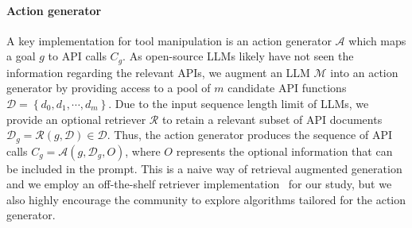 \paragraph{Action generator} A key implementation for tool manipulation is an action generator $\mathcal{A}$
which maps a goal $g$ to API calls $ C_g$. As open-source LLMs likely have not seen the information regarding the relevant APIs, we augment an LLM $\mathcal{M}$ into an action generator by providing access to a pool of $m$ candidate API functions $\mathcal{D} =\left\{d_0, d_1, \cdots, d_m \right\}$.
Due to the input sequence length limit of LLMs, we provide an optional retriever $\mathcal{R}$ to retain a relevant subset of API documents $\mathcal{D}_g = \mathcal{R}\left(g, 
\mathcal{D}\right) \in \mathcal{D}$. 
Thus, the action generator produces the sequence of API calls $C_g = \mathcal{A}\left(g, \mathcal{D}_g, O\right)$, where $O$ represents the optional information that can be included in the prompt. 
This is a naive way of retrieval augmented generation \cite{ram2023context, lewis2020retrieval, izacard2022few} and we employ an off-the-shelf retriever implementation~\cite{bm25} for our study, but we also highly encourage the community to explore algorithms tailored for the action generator.

